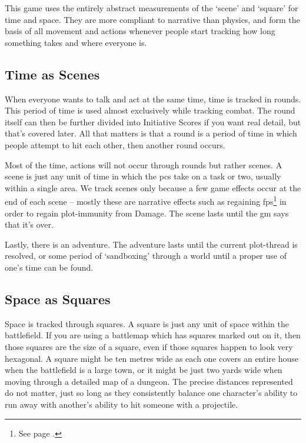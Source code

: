 \begin{multicols}{2}

This game uses the entirely abstract measurements of the `scene' and `square' for time and space. They are more compliant to narrative than physics, and form the basis of all movement and actions whenever people start tracking how long something takes and where everyone is.

\subsection{Time as Scenes}

When everyone wants to talk and act at the same time, time is tracked in \glspl{round}.
This period of time is used almost exclusively while tracking combat.
The \gls{round} itself can then be further divided into Initiative Scores if you want real detail, but that's covered later.
All that matters is that a \gls{round} is a period of time in which people attempt to hit each other, then another \gls{round} occurs.

Most of the time, actions will not occur through \glspl{round} but rather scenes. A scene is just any unit of time in which the \glspl{pc} take on a task or two, usually within a single area. We track scenes only because a few game effects occur at the end of each scene -- mostly these are narrative effects such as regaining \glspl{fp}\footnote{See page \pageref{fate_points}.} in order to regain plot-immunity from Damage. The scene lasts until the \gls{gm} says that it's over.

Lastly, there is an adventure. The adventure lasts until the current plot-thread is resolved, or some period of `sandboxing' through a world until a proper use of one's time can be found.

\subsection{Space as Squares}

Space is tracked through \glspl{square}.
A \gls{square} is just any unit of space within the battlefield.
If you are using a battlemap which has squares marked out on it, then those squares are the size of a square, even if those squares happen to look very hexagonal.
A square might be ten metres wide as each one covers an entire house when the battlefield is a large town, or it might be just two yards wide when moving through a detailed map of a dungeon.
The precise distances represented do not matter, just so long as they consistently balance one character's ability to run away with another's ability to hit someone with a projectile.


\end{multicols}
